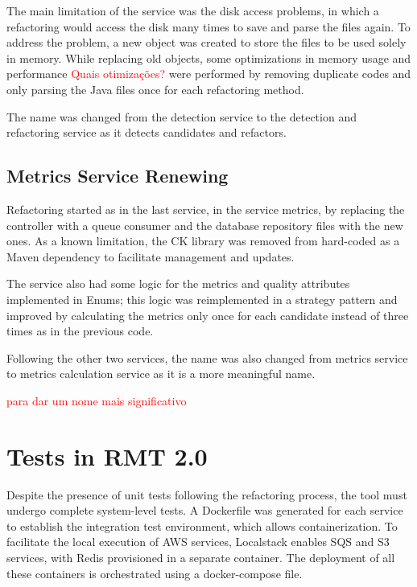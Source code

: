 The main limitation of the service was the disk access problems, in which a refactoring would access the disk many times to save and parse the files again. To address the problem, a new object was created to store the files to be used solely in memory. While replacing old objects, some optimizations in memory usage and performance \textcolor{red}{Quais otimizações?} were performed by removing duplicate codes and only parsing the Java files once for each refactoring method.

The name was changed from the detection service to the detection and refactoring service as it detects candidates and refactors.



\subsection{Metrics Service Renewing}
\label{sec-restruct-metrics}

Refactoring started as in the last service, in the service metrics, by replacing the controller with a queue consumer and the database repository files with the new ones. As a known limitation, the CK library \textcite{ck} was removed from hard-coded as a Maven dependency to facilitate management and updates. 

The service also had some logic for the metrics and quality attributes implemented in Enums; this logic was reimplemented in a strategy pattern and improved by calculating the metrics only once for each candidate instead of three times as in the previous code.

Following the other two services, the name was also changed from metrics service to metrics calculation service as it is a more meaningful name. 

\textcolor{red}{para dar um nome mais significativo}


\section{Tests in RMT 2.0}
\label{sec-test-rmt}

Despite the presence of unit tests following the refactoring process, the tool must undergo complete system-level tests. A Dockerfile was generated for each service to establish the integration test environment, which allows containerization. To facilitate the local execution of AWS services, Localstack enables SQS and S3 services, with Redis provisioned in a separate container. The deployment of all these containers is orchestrated using a docker-compose file.

